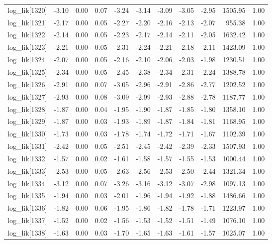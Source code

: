 \begin{table}[ht]
\begin{tabular}{rrrrrrrrrrr}
  log\_lik[1320] & -3.10 & 0.00 & 0.07 & -3.24 & -3.14 & -3.09 & -3.05 & -2.95 & 1505.95 & 1.00 \\ 
  log\_lik[1321] & -2.17 & 0.00 & 0.05 & -2.27 & -2.20 & -2.16 & -2.13 & -2.07 & 955.38 & 1.00 \\ 
  log\_lik[1322] & -2.14 & 0.00 & 0.05 & -2.23 & -2.17 & -2.14 & -2.11 & -2.05 & 1632.42 & 1.00 \\ 
  log\_lik[1323] & -2.21 & 0.00 & 0.05 & -2.31 & -2.24 & -2.21 & -2.18 & -2.11 & 1423.09 & 1.00 \\ 
  log\_lik[1324] & -2.07 & 0.00 & 0.05 & -2.16 & -2.10 & -2.06 & -2.03 & -1.98 & 1230.51 & 1.00 \\ 
  log\_lik[1325] & -2.34 & 0.00 & 0.05 & -2.45 & -2.38 & -2.34 & -2.31 & -2.24 & 1388.78 & 1.00 \\ 
  log\_lik[1326] & -2.91 & 0.00 & 0.07 & -3.05 & -2.96 & -2.91 & -2.86 & -2.77 & 1202.52 & 1.00 \\ 
  log\_lik[1327] & -2.93 & 0.00 & 0.08 & -3.09 & -2.99 & -2.93 & -2.88 & -2.78 & 1187.77 & 1.00 \\ 
  log\_lik[1328] & -1.87 & 0.00 & 0.04 & -1.95 & -1.90 & -1.87 & -1.85 & -1.80 & 1358.10 & 1.00 \\ 
  log\_lik[1329] & -1.87 & 0.00 & 0.03 & -1.93 & -1.89 & -1.87 & -1.84 & -1.81 & 1168.95 & 1.00 \\ 
  log\_lik[1330] & -1.73 & 0.00 & 0.03 & -1.78 & -1.74 & -1.72 & -1.71 & -1.67 & 1102.39 & 1.00 \\ 
  log\_lik[1331] & -2.42 & 0.00 & 0.05 & -2.51 & -2.45 & -2.42 & -2.39 & -2.33 & 1507.93 & 1.00 \\ 
  log\_lik[1332] & -1.57 & 0.00 & 0.02 & -1.61 & -1.58 & -1.57 & -1.55 & -1.53 & 1000.44 & 1.00 \\ 
  log\_lik[1333] & -2.53 & 0.00 & 0.05 & -2.63 & -2.56 & -2.53 & -2.50 & -2.44 & 1321.34 & 1.00 \\ 
  log\_lik[1334] & -3.12 & 0.00 & 0.07 & -3.26 & -3.16 & -3.12 & -3.07 & -2.98 & 1097.13 & 1.00 \\ 
  log\_lik[1335] & -1.94 & 0.00 & 0.03 & -2.01 & -1.96 & -1.94 & -1.92 & -1.88 & 1486.66 & 1.00 \\ 
  log\_lik[1336] & -1.82 & 0.00 & 0.06 & -1.95 & -1.86 & -1.82 & -1.78 & -1.71 & 1223.97 & 1.00 \\ 
  log\_lik[1337] & -1.52 & 0.00 & 0.02 & -1.56 & -1.53 & -1.52 & -1.51 & -1.49 & 1076.10 & 1.00 \\ 
  log\_lik[1338] & -1.63 & 0.00 & 0.03 & -1.70 & -1.65 & -1.63 & -1.61 & -1.57 & 1025.07 & 1.00 \\ 

\end{tabular}
\end{table}

